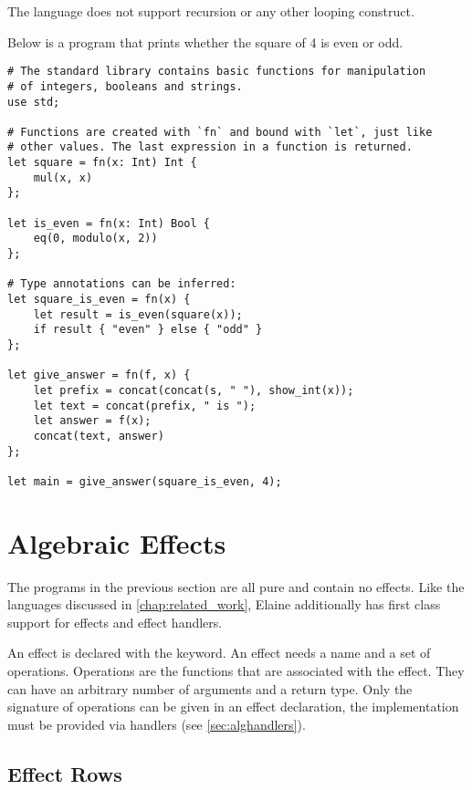 The language does not support recursion or any other looping construct.

Below is a program that prints whether the square of 4 is even or odd. 

\begin{lstlisting}[language=elaine, style=fancy]
# The standard library contains basic functions for manipulation
# of integers, booleans and strings.
use std;

# Functions are created with `fn` and bound with `let`, just like
# other values. The last expression in a function is returned.
let square = fn(x: Int) Int {
    mul(x, x)
};

let is_even = fn(x: Int) Bool {
    eq(0, modulo(x, 2))
};

# Type annotations can be inferred:
let square_is_even = fn(x) {
    let result = is_even(square(x));
    if result { "even" } else { "odd" }
};

let give_answer = fn(f, x) {
	let prefix = concat(concat(s, " "), show_int(x));
    let text = concat(prefix, " is ");
    let answer = f(x);
    concat(text, answer)
};

let main = give_answer(square_is_even, 4);
\end{lstlisting}

\section{Algebraic Effects}

The programs in the previous section are all pure and contain no effects. Like the languages discussed in \cref{chap:related_work}, Elaine additionally has first class support for effects and effect handlers.

An effect is declared with the  keyword. An effect needs a name and a set of operations. Operations are the functions that are associated with the effect. They can have an arbitrary number of arguments and a return type. Only the signature of operations can be given in an effect declaration, the implementation must be provided via handlers (see \cref{sec:alghandlers}).

\subsection{Effect Rows}


